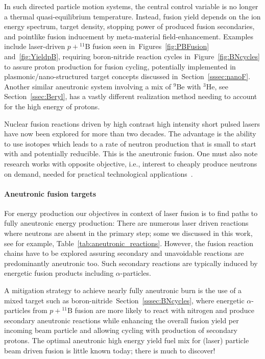 \documentclass[particles,article,accept,pdftex,moreauthors]{Definitions/mdpi}
\begin{document}
In such directed particle motion systems, the central control variable is no longer a thermal quasi-equilibrium temperature. Instead, fusion yield depends on the ion energy spectrum, target density, stopping power of produced fusion secondaries, and pointlike fusion inducement by meta-material field-enhancement. Examples include laser-driven $p+{}^{11}\mathrm{B}$ fusion seen in~Figures~\ref{fig:PBFusion} and~\ref{fig:YieldpB}, requiring boron-nitride reaction cycles in~Figure~\ref{fig:BNcycles} to assure proton production for fusion cycling, potentially implemented in plasmonic/nano-structured target concepts discussed in~Section~\ref{sssec:nanoF}. Another similar aneutronic system involving a mix of ${}^9\mathrm{Be}$ with ${}^{3}\mathrm{He}$, see Section~\ref{ssec:Beryl}, has a vastly different realization method needing to account for the high energy of protons.

Nuclear fusion reactions driven by high contrast high intensity short pulsed lasers have now been explored for more than two decades. The advantage is the ability to use isotopes which leads to a rate of neutron production that is small to start with and potentially reducible. This is the aneutronic fusion. One must also note research works with opposite objective, i.e., interest to cheaply produce neutrons on demand, needed for practical technological applications~\cite{Karsch2002Neutrons}.


\paragraph*{\bf Aneutronic fusion targets}
For energy production our objectives in context of laser fusion is to find paths to fully aneutronic energy production: There are numerous laser driven reactions where neutrons are absent in the primary step; some we discussed in this work, see for example, Table~\ref{tab:aneutronic_reactions}. However, the fusion reaction chains have to be explored assuring secondary and unavoidable reactions are predominantly aneutronic too. Such secondary reactions are typically induced by energetic fusion products including $\alpha$-particles.

A mitigation strategy to achieve nearly fully aneutronic burn is the use of a mixed target such as boron-nitride~Section~\ref{sssec:BNcycles}, where energetic $\alpha$-particles from $p+{}^{11}\mathrm{B}$ fusion are more likely to react with nitrogen and produce secondary aneutronic reactions while enhancing the overall fusion yield per incoming beam particle and allowing cycling with production of secondary protons. The optimal aneutronic high energy yield fuel mix for (laser) particle beam driven fusion is little known today; there is much to discover!
\end{document}
